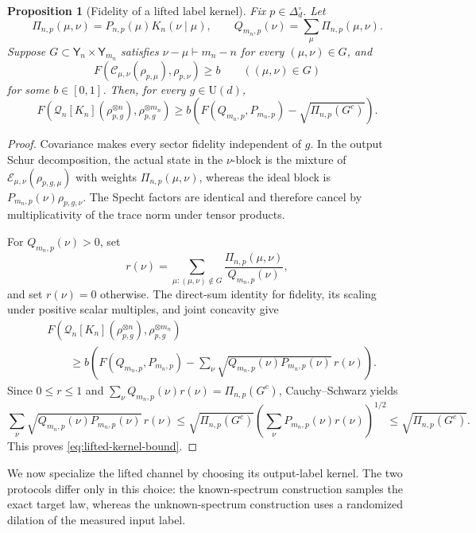 \documentclass[11pt]{article}
\newtheorem{proposition}[proposition]{Proposition}
\theoremstyle{remark}
\theoremstyle{plain}
\newcommand{\cC}{\mathcal C}
\newcommand{\cE}{\mathcal E}
\newcommand{\U}{\mathrm U}
\newcommand{\ot}{\otimes}
\begin{document}
\begin{proposition}[Fidelity of a lifted label kernel]
\label{prop:lifted-kernel-bound}
Fix \(p\in\Delta_d^\circ\).  Let
\[
  \Pi_{n,p}(\mu,\nu)=P_{n,p}(\mu)K_n(\nu\mid\mu),
  \qquad
  Q_{m_n,p}(\nu)=\sum_\mu\Pi_{n,p}(\mu,\nu).
\]
Suppose \(G\subset\mathsf Y_n\times\mathsf Y_{m_n}\) satisfies
\(\nu-\mu\vdash m_n-n\) for every \((\mu,\nu)\in G\), and
\[
  F\!\left(\cC_{\mu,\nu}(\rho_{p,\mu}),\rho_{p,\nu}\right)\ge b
  \qquad((\mu,\nu)\in G)
\]
for some \(b\in[0,1]\).  Then, for every \(g\in\U(d)\),
\begin{equation}\label{eq:lifted-kernel-bound}
  F\!\left(
    \mathcal Q_n[K_n](\rho_{p,g}^{\ot n}),
    \rho_{p,g}^{\ot m_n}
  \right)
  \ge b\left(F(Q_{m_n,p},P_{m_n,p})-\sqrt{\Pi_{n,p}(G^c)}\right).
\end{equation}
\end{proposition}

\begin{proof}
Covariance makes every sector fidelity independent of \(g\).  In the output
Schur decomposition, the actual state in the \(\nu\)-block is the mixture of
\(\cE_{\mu,\nu}(\rho_{p,g,\mu})\) with weights
\(\Pi_{n,p}(\mu,\nu)\), whereas the ideal block is
\(P_{m_n,p}(\nu)\rho_{p,g,\nu}\).  The Specht factors are identical
and therefore cancel by multiplicativity of the trace norm under tensor
products.

For \(Q_{m_n,p}(\nu)>0\), set
\[
  r(\nu)=\sum_{\mu:(\mu,\nu)\notin G}
  \frac{\Pi_{n,p}(\mu,\nu)}{Q_{m_n,p}(\nu)},
\]
and set \(r(\nu)=0\) otherwise.  The direct-sum identity for fidelity,
its scaling under positive scalar multiples, and joint concavity give
\[
\begin{aligned}
  &F\!\left(
    \mathcal Q_n[K_n](\rho_{p,g}^{\ot n}),
    \rho_{p,g}^{\ot m_n}
  \right)\\
  &\qquad\ge
  b\left(
    F(Q_{m_n,p},P_{m_n,p})
    -\sum_\nu
      \sqrt{Q_{m_n,p}(\nu)P_{m_n,p}(\nu)}\,r(\nu)
  \right).
\end{aligned}
\]
Since \(0\le r\le1\) and
\(\sum_\nu Q_{m_n,p}(\nu)r(\nu)=\Pi_{n,p}(G^c)\),
Cauchy--Schwarz yields
\[
  \sum_\nu\sqrt{Q_{m_n,p}(\nu)P_{m_n,p}(\nu)}\,r(\nu)
  \le
  \sqrt{\Pi_{n,p}(G^c)}
  \left(\sum_\nu P_{m_n,p}(\nu)r(\nu)\right)^{1/2}
  \le\sqrt{\Pi_{n,p}(G^c)}.
\]
This proves \eqref{eq:lifted-kernel-bound}.
\end{proof}

We now specialize the lifted channel by choosing its output-label kernel.
The two protocols differ only in this choice: the known-spectrum construction
samples the exact target law, whereas the unknown-spectrum construction uses
a randomized dilation of the measured input label.
\end{document}
